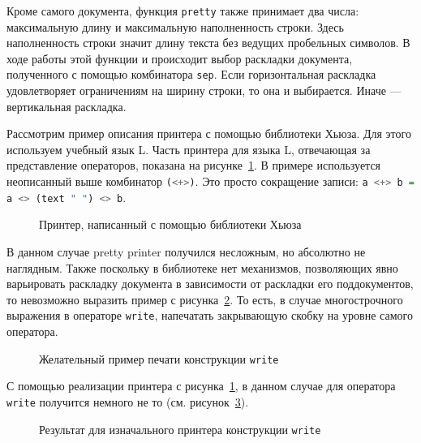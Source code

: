 

Кроме самого документа, функция \lstinline[language=Haskell]{pretty} также принимает два числа: максимальную длину и максимальную наполненность строки. Здесь наполненность строки значит длину текста без ведущих пробельных символов. В ходе работы этой функции и происходит выбор раскладки документа, полученного с помощью комбинатора \lstinline[language=Haskell]{sep}. Если горизонтальная раскладка удовлетворяет ограничениям на ширину строки, то она и выбирается. Иначе ---вертикальная раскладка.



Рассмотрим пример описания принтера с помощью библиотеки Хьюза. Для этого используем учебный язык L. Часть принтера для языка L, отвечающая за представление операторов, показана на рисунке~\ref{fig:lHughesPrinter}.
В примере используется неописанный выше комбинатор \lstinline[language=Haskell]{(<+>)}. Это просто сокращение записи: \lstinline[language=Haskell]{a <+> b = a <> (text " ") <> b}.
\begin{figure}[h!]
	
	\caption{Принтер, написанный с помощью библиотеки Хьюза}
	\label{fig:lHughesPrinter}
\end{figure}

В данном случае pretty printer получился несложным, но абсолютно не наглядным. Также поскольку в библиотеке нет механизмов, позволяющих явно варьировать раскладку документа в зависимости от раскладки его поддокументов, то невозможно выразить пример с рисунка~\ref{fig:lGoodWriteEx}.
То есть, в случае многострочного выражения в операторе \lstinline[language=llang]{write}, напечатать закрывающую скобку на уровне самого оператора.

\begin{figure}[h!]
	
	\caption{Желательный пример печати конструкции \lstinline[language=llang]{write}}
	\label{fig:lGoodWriteEx}
\end{figure}

С помощью реализации принтера с рисунка~\ref{fig:lHughesPrinter}, в данном случае для оператора \lstinline[language=llang]{write} получится немного не то (см. рисунок~\ref{fig:lCurWriteEx}).
\begin{figure}[h!]
	
	\caption{Результат для изначального принтера конструкции \lstinline[language=llang]{write}}
	\label{fig:lCurWriteEx}
\end{figure}

